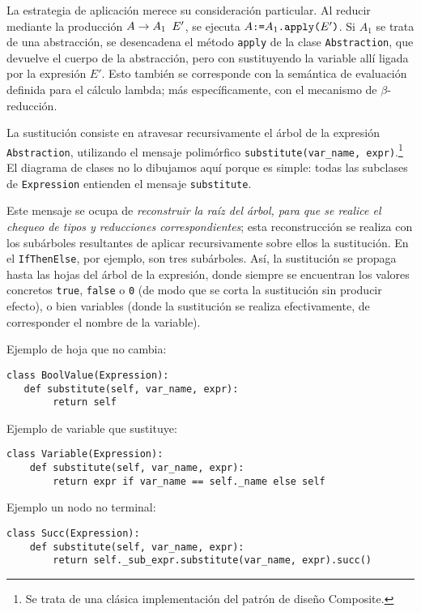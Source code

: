 \documentclass[11pt]{article}
\begin{document}
La estrategia de aplicación merece su consideración particular. Al reducir mediante la producción $A \rightarrow A_1 \verb| | E'$, se ejecuta $A \verb|:=| A_1\verb|.apply(|E'\verb|)|$. Si $A_1$ se trata de una abstracción, se desencadena el método \lstinline|apply| de la clase \lstinline|Abstraction|, que devuelve el cuerpo de la abstracción, pero con sustituyendo la variable allí ligada por la expresión $E'$. Esto también se corresponde con la semántica de evaluación definida para el cálculo lambda; más específicamente, con el mecanismo de $\beta$-reducción.

La sustitución consiste en atravesar recursivamente el árbol de la expresión \lstinline|Abstraction|, utilizando el mensaje polimórfico \lstinline|substitute(var_name, expr)|.\footnote{Se trata de una clásica implementación del patrón de diseño Composite.}
El diagrama de clases no lo dibujamos aquí porque es simple: todas las subclases de \lstinline|Expression| entienden el mensaje \lstinline|substitute|.

Este mensaje se ocupa de \emph{reconstruir la raíz del árbol, para que se realice el chequeo de tipos y reducciones correspondientes}; esta reconstrucción se realiza con los subárboles resultantes de aplicar recursivamente sobre ellos la sustitución. En el \lstinline|IfThenElse|, por ejemplo, son tres subárboles. Así, la sustitución se propaga hasta las hojas del árbol de la expresión, donde siempre se encuentran los valores concretos \verb|true|, \verb|false| o \verb|0| (de modo que se corta la sustitución sin producir efecto), o bien variables (donde la sustitución se realiza efectivamente, de corresponder el nombre de la variable).

Ejemplo de hoja que no cambia:
\begin{lstlisting}
class BoolValue(Expression):
   def substitute(self, var_name, expr):
        return self
\end{lstlisting}
        
Ejemplo de variable que sustituye:
\begin{lstlisting}
class Variable(Expression):
    def substitute(self, var_name, expr):
        return expr if var_name == self._name else self
\end{lstlisting}

Ejemplo un nodo no terminal:
\begin{lstlisting}
class Succ(Expression):
    def substitute(self, var_name, expr):
        return self._sub_expr.substitute(var_name, expr).succ()
\end{lstlisting}
        
\end{document}
